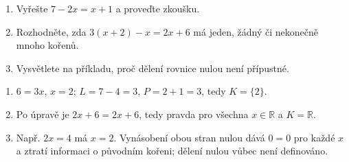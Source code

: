\documentclass[11pt,a4paper]{article}
\begin{document}
\begin{zadaniReseniBox}
\begin{enumerate}[label=\alph*)]
\item Vyřešte $7-2x=x+1$ a proveďte zkoušku.
\item Rozhodněte, zda $3(x+2)-x=2x+6$ má jeden, žádný či nekonečně mnoho kořenů.
\item Vysvětlete na příkladu, proč dělení rovnice nulou není přípustné.
\end{enumerate}
\tcblower
\begin{enumerate}[label=\alph*)]
\item $6=3x$, $x=2$; $L=7-4=3$, $P=2+1=3$, tedy $K=\{2\}$.
\item Po úpravě je $2x+6=2x+6$, tedy pravda pro všechna $x\in\mathbb R$ a $K=\mathbb R$.
\item Např. $2x=4$ má $x=2$. Vynásobení obou stran nulou dává $0=0$ pro každé $x$ a ztratí informaci o původním kořeni; dělení nulou vůbec není definováno.
\end{enumerate}
\end{zadaniReseniBox}
\end{document}
